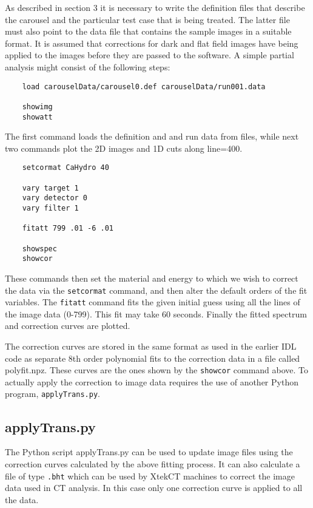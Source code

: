 \documentclass[a4paper]{article}
\begin{document}
As described in section 3 it is necessary to write the definition files that describe the carousel and the particular
test case that is being treated.
The latter file must also point to the data file that contains the sample images in a suitable format.
It is assumed that corrections for dark and flat field images have being applied to the images before they are
passed to the software.
A simple partial analysis might consist of the following steps:
\begin{verbatim}
    load carouselData/carousel0.def carouselData/run001.data

    showimg
    showatt
\end{verbatim}
The first command loads the definition and and run data from files, while next two commands
plot the 2D images and 1D cuts along line=400.

\begin{verbatim}
    setcormat CaHydro 40

    vary target 1
    vary detector 0
    vary filter 1

    fitatt 799 .01 -6 .01

    showspec
    showcor
\end{verbatim}
These commands then set the material and energy to which we wish to correct the data via the \texttt{setcormat}
command, and then alter the default orders of the fit variables.
The \texttt{fitatt} command fits the given initial guess using all the lines of the image data (0-799).
This fit may take 60 seconds. Finally the fitted spectrum and correction curves are plotted.

The correction curves are stored in the same format as used in the earlier IDL code as separate 8th order polynomial
fits to the correction data in a file called polyfit.npz.
These curves are the ones shown by the \texttt{showcor} command above.
To actually apply the correction to image data requires the use of another Python program, \texttt{applyTrans.py}.

\subsection{applyTrans.py}

The Python script applyTrans.py can be used to update image files using the correction curves calculated by
the above fitting process.
It can also calculate a file of type \texttt{.bht} which can be used by XtekCT machines to correct the image
data used in CT analysis. In this case only one correction curve is applied to all the data.
\end{document}
